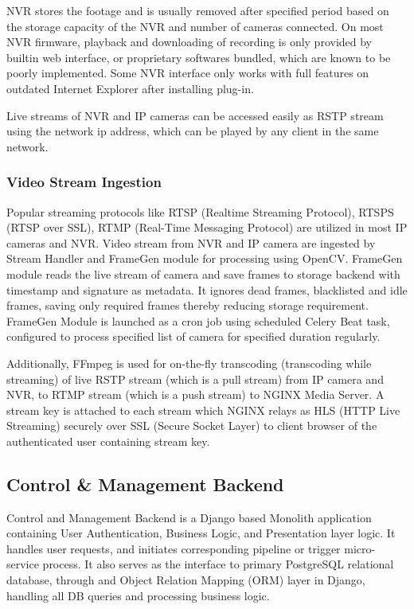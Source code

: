 NVR stores the footage and is usually removed after specified period based on the storage capacity of the NVR and number of cameras connected. On most NVR firmware, playback and downloading of recording is only provided by builtin web interface, or proprietary softwares bundled, which are known to be poorly implemented. Some NVR interface only works with full features on outdated Internet Explorer after installing plug-in.

Live streams of NVR and IP cameras can be accessed easily as RSTP stream using the network ip address, which can be played by any client in the same network.


\subsubsection{Video Stream Ingestion}
Popular streaming protocols like RTSP (Realtime Streaming Protocol), RTSPS (RTSP over SSL), RTMP (Real-Time Messaging Protocol) are utilized in most IP cameras and NVR. 
Video stream from NVR and IP camera are ingested by Stream Handler and FrameGen module for processing using OpenCV. FrameGen module reads the live stream of camera and save frames to storage backend with timestamp and signature as metadata. It ignores dead frames, blacklisted and idle frames, saving only required frames thereby reducing storage requirement. FrameGen Module is launched as a cron job using scheduled Celery Beat task, configured to process specified list of camera for specified duration regularly. 

Additionally, FFmpeg is used for on-the-fly transcoding (transcoding while streaming) of live RSTP stream (which is a pull stream) from IP camera and NVR, to RTMP stream (which is a push stream) to NGINX Media Server. A stream key is attached to each stream which NGINX relays as HLS (HTTP Live Streaming) securely over SSL (Secure Socket Layer) to client browser of the authenticated user containing stream key.   

\subsection{Control \& Management Backend}
Control and Management Backend is a Django based Monolith application containing User Authentication, Business Logic, and Presentation layer logic. It handles user requests, and initiates corresponding pipeline or trigger micro-service process. It also serves as the interface to primary PostgreSQL relational database, through and Object Relation Mapping (ORM) layer in Django, handling all DB queries and processing business logic.

